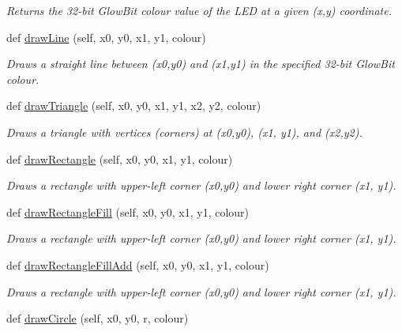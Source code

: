 \begin{DoxyCompactItemize}
\begin{DoxyCompactList}\small\item\em Returns the 32-\/bit Glow\+Bit colour value of the L\+ED at a given (x,y) coordinate. \end{DoxyCompactList}\item 
def \hyperlink{classglowbit_1_1glowbitMatrix_a373a7739051a7399a94636375ac0b4ec}{draw\+Line} (self, x0, y0, x1, y1, colour)
\begin{DoxyCompactList}\small\item\em Draws a straight line between (x0,y0) and (x1,y1) in the specified 32-\/bit Glow\+Bit colour. \end{DoxyCompactList}\item 
def \hyperlink{classglowbit_1_1glowbitMatrix_ac0b08486a62b6bd9c8633287d2725f43}{draw\+Triangle} (self, x0, y0, x1, y1, x2, y2, colour)
\begin{DoxyCompactList}\small\item\em Draws a triangle with vertices (corners) at (x0,y0), (x1, y1), and (x2,y2). \end{DoxyCompactList}\item 
def \hyperlink{classglowbit_1_1glowbitMatrix_ad70235a976475054af4ccb534a32b5e7}{draw\+Rectangle} (self, x0, y0, x1, y1, colour)
\begin{DoxyCompactList}\small\item\em Draws a rectangle with upper-\/left corner (x0,y0) and lower right corner (x1, y1). \end{DoxyCompactList}\item 
def \hyperlink{classglowbit_1_1glowbitMatrix_ad91952585c61527ae5c0ac4a170435bf}{draw\+Rectangle\+Fill} (self, x0, y0, x1, y1, colour)
\begin{DoxyCompactList}\small\item\em Draws a rectangle with upper-\/left corner (x0,y0) and lower right corner (x1, y1). \end{DoxyCompactList}\item 
def \hyperlink{classglowbit_1_1glowbitMatrix_aa72808f05c675cea41b1cfd66e1ab3f2}{draw\+Rectangle\+Fill\+Add} (self, x0, y0, x1, y1, colour)
\begin{DoxyCompactList}\small\item\em Draws a rectangle with upper-\/left corner (x0,y0) and lower right corner (x1, y1). \end{DoxyCompactList}\item 
def \hyperlink{classglowbit_1_1glowbitMatrix_a4efec5ce17c30403505b1f2775022e90}{draw\+Circle} (self, x0, y0, r, colour)

\end{DoxyCompactItemize}

